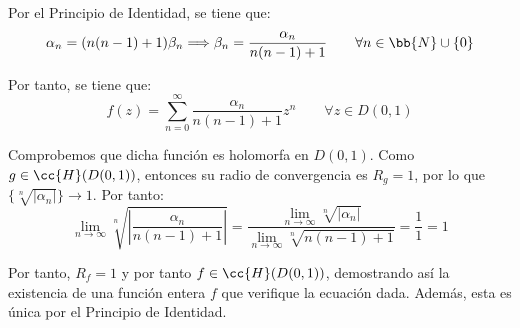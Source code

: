 \documentclass[12pt]{article}
\begin{document}
\begin{ejercicio}[3.5 puntos]
        Por el Principio de Identidad, se tiene que:
        \begin{equation*}
            \alpha_n = (n(n-1)+1)\beta_n\Longrightarrow \beta_n = \frac{\alpha_n}{n(n-1)+1} \qquad \forall n\in\bb{N}\cup \{0\}
        \end{equation*}

        Por tanto, se tiene que:
        \begin{equation*}
            f(z) = \sum_{n=0}^{\infty} \frac{\alpha_n}{n(n-1)+1} z^n \qquad \forall z\in D(0,1)
        \end{equation*}

        Comprobemos que dicha función es holomorfa en $D(0,1)$. Como $g\in \cc{H}(D(0,1))$, entonces su radio de convergencia es $R_g=1$, por lo que $\{\sqrt[n]{|\alpha_n|}\}\to 1$. Por tanto:
        \begin{equation*}
            \lim_{n\to\infty} \sqrt[n]{\left|\frac{\alpha_n}{n(n-1)+1}\right|} = \dfrac{\lim_{n\to\infty} \sqrt[n]{|\alpha_n|}}{\lim_{n\to\infty} \sqrt[n]{n(n-1)+1}} = \dfrac{1}{1} = 1
        \end{equation*}

        Por tanto, $R_f=1$ y por tanto $f\in \cc{H}(D(0,1))$, demostrando así la existencia de una función entera $f$ que verifique la ecuación dada. Además, esta es única por el Principio de Identidad.
    \end{ejercicio}
\end{document}
